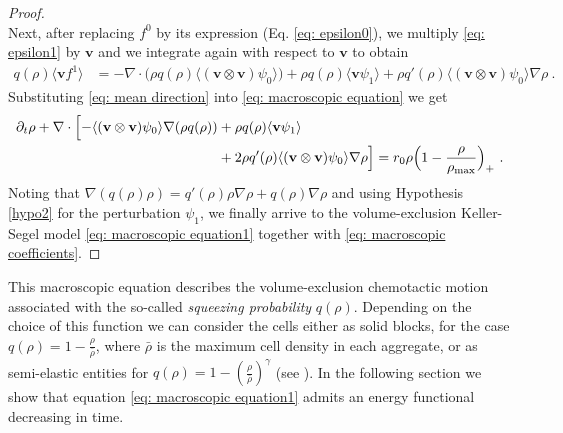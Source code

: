 \documentclass[review,onefignum,onetabnum]{siamart220329}
\begin{document}
\begin{proof}
\begin{equation}
\end{equation}
Next, after replacing $f^0$ by its expression (Eq. \cref{eq: epsilon0}), we multiply \cref{eq: epsilon1} by $\mathbf{v}$ and we integrate again with respect to $\mathbf{v}$ to obtain
\begin{align}
    q(\rho)\langle\mathbf{v}f^1\rangle&=- \nabla \cdot \big(\rho q(\rho) \langle(\mathbf{v}\otimes \mathbf{v})\psi_0\rangle \big)+\rho q(\rho)\langle \mathbf{v}\psi_1\rangle  +\rho q'(\rho) \langle(\mathbf{v}\otimes \mathbf{v})\psi_0\rangle  \nabla\rho\ .\label{eq: mean direction}
\end{align}
Substituting \cref{eq: mean direction} into \cref{eq: macroscopic equation} we get
\begin{align*}
    \partial_t\rho+\nabla\cdot\Bigl[-\langle(\mathbf{v}\otimes \mathbf{v}) \psi_0\rangle \nabla(\rho q(\rho))&+\rho q(\rho)\langle\mathbf{v} \psi_1\rangle \nonumber\\
    &+2 \rho q'(\rho)\langle(\mathbf{v}\otimes \mathbf{v})\psi_0\rangle\nabla\rho  \Bigr]={ r_0\rho\Bigl(1-\frac{\rho}{\rho_{\textnormal{max}}} \Bigr)_+}\ . 
\end{align*}
Noting that $\nabla(q(\rho)\rho)=q'(\rho)\rho\nabla\rho+q(\rho)\nabla\rho$ and using Hypothesis \cref{hypo2} for the perturbation $\psi_1$, we finally arrive to the volume-exclusion Keller-Segel model \cref{eq: macroscopic equation1} together with \cref{eq: macroscopic coefficients}.
\end{proof}


This macroscopic equation describes the
volume-exclusion chemotactic motion associated with the so-called \emph{squeezing probability} $q(\rho)$. Depending on the choice of this function we can consider the cells either as solid blocks, for the case $q(\rho)=1-\frac{\rho}{\bar{\rho}}$, where $\bar{\rho}$ is the maximum cell density in each aggregate, or as semi-elastic entities for $q(\rho)=1-\left(\frac{\rho}{\bar{\rho}} \right)^\gamma$ (see \cite{wang2007classical}). {In the following section we show that equation \cref{eq: macroscopic equation1} admits an energy functional decreasing in time}. 
\end{document}
